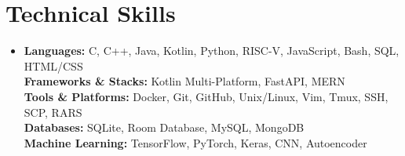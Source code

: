 \documentclass[letterpaper,11px]{article}
\begin{document}
\section{Technical Skills}
\begin{itemize}[leftmargin=0.15in, label={}]
  \item[]{
    \textbf{Languages:} C, C++, Java, Kotlin, Python, RISC-V, JavaScript, Bash, SQL, HTML/CSS \\
		\textbf{Frameworks \& Stacks:} Kotlin Multi-Platform, FastAPI, MERN \\
    \textbf{Tools \& Platforms:} Docker, Git, GitHub, Unix/Linux, Vim, Tmux, SSH, SCP, RARS \\
    \textbf{Databases:} SQLite, Room Database, MySQL, MongoDB \\
    \textbf{Machine Learning:} TensorFlow, PyTorch, Keras, CNN, Autoencoder
  }
\end{itemize}
\vspace{-4pt}
\end{document}
